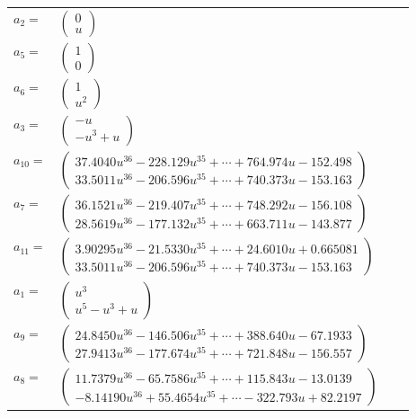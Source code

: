 \documentclass[1p]{elsarticle_modified}
\theoremstyle{definition}
\begin{document}
\begin{tabular}{m{7pt} m{180pt} m{7pt} m{180pt} }
\flushright $a_{2}=$&$\begin{pmatrix}0\\u\end{pmatrix}$ \\
\flushright $a_{5}=$&$\begin{pmatrix}1\\0\end{pmatrix}$ \\
\flushright $a_{6}=$&$\begin{pmatrix}1\\u^2\end{pmatrix}$ \\
\flushright $a_{3}=$&$\begin{pmatrix}- u\\- u^3+u\end{pmatrix}$ \\
\flushright $a_{10}=$&$\begin{pmatrix}37.4040 u^{36}-228.129 u^{35}+\cdots+764.974 u-152.498\\33.5011 u^{36}-206.596 u^{35}+\cdots+740.373 u-153.163\end{pmatrix}$ \\
\flushright $a_{7}=$&$\begin{pmatrix}36.1521 u^{36}-219.407 u^{35}+\cdots+748.292 u-156.108\\28.5619 u^{36}-177.132 u^{35}+\cdots+663.711 u-143.877\end{pmatrix}$ \\
\flushright $a_{11}=$&$\begin{pmatrix}3.90295 u^{36}-21.5330 u^{35}+\cdots+24.6010 u+0.665081\\33.5011 u^{36}-206.596 u^{35}+\cdots+740.373 u-153.163\end{pmatrix}$ \\
\flushright $a_{1}=$&$\begin{pmatrix}u^3\\u^5- u^3+u\end{pmatrix}$ \\
\flushright $a_{9}=$&$\begin{pmatrix}24.8450 u^{36}-146.506 u^{35}+\cdots+388.640 u-67.1933\\27.9413 u^{36}-177.674 u^{35}+\cdots+721.848 u-156.557\end{pmatrix}$ \\
\flushright $a_{8}=$&$\begin{pmatrix}11.7379 u^{36}-65.7586 u^{35}+\cdots+115.843 u-13.0139\\-8.14190 u^{36}+55.4654 u^{35}+\cdots-322.793 u+82.2197\end{pmatrix}$ \\

\end{tabular}
\end{document}
